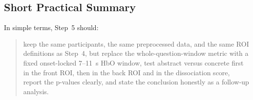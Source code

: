 \documentclass[11pt]{article}
\begin{document}
\subsection{Short Practical Summary}
In simple terms, Step~5 should:
\begin{quote}
keep the same participants, the same preprocessed data, and the same ROI definitions as Step~4,
but replace the whole-question-window metric with a fixed onset-locked 7--11~s HbO window,
test abstract versus concrete first in the front ROI, then in the back ROI and in the dissociation score,
report the p-values clearly, and state the conclusion honestly as a follow-up analysis.
\end{quote}
\end{document}
